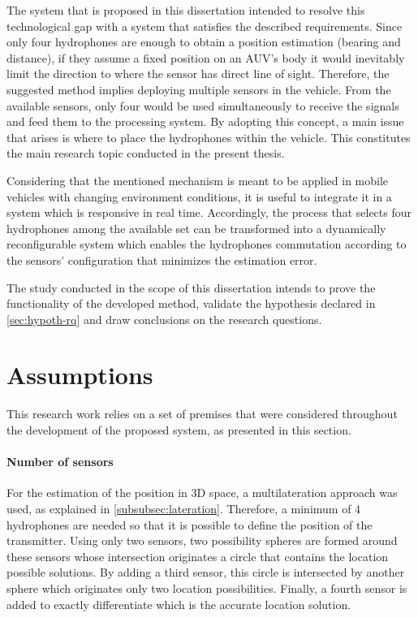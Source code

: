 The system that is proposed in this dissertation intended to resolve this technological gap with a system that satisfies the described requirements. Since only four hydrophones are enough to obtain a position estimation (bearing and distance), if they assume a fixed position on an AUV's body it would inevitably limit the direction to where the sensor has direct line of sight. Therefore, the suggested method implies deploying multiple sensors in the vehicle. From the available sensors, only four would be used simultaneously to receive the signals and feed them to the processing system. By adopting this concept, a main issue that arises is where to place the hydrophones within the vehicle. This constitutes the main research topic conducted in the present thesis.

Considering that the mentioned mechanism is meant to be applied in mobile vehicles with changing environment conditions, it is useful to integrate it in a system which is responsive in real time. Accordingly, the process that selects four hydrophones among the available set can be transformed into a dynamically reconfigurable system which enables the hydrophones commutation according to the sensors' configuration that minimizes the estimation error.

The study conducted in the scope of this dissertation intends to prove the functionality of the developed method, validate the hypothesis declared in \ref{sec:hypoth-rq} and draw conclusions on the research questions.

\section{Assumptions} \label{sec:premises}

This research work relies on a set of premises that were considered throughout the development of the proposed system, as presented in this section.

\paragraph{Number of sensors} For the estimation of the position in 3D space, a multilateration approach was used, as explained in \ref{subsubsec:lateration}. Therefore, a minimum of 4 hydrophones are needed so that it is possible to define the position of the transmitter. Using only two sensors, two possibility spheres are formed around these sensors whose intersection originates a circle that contains the location possible solutions. By adding a third sensor, this circle is intersected by another sphere which originates only two location possibilities. Finally, a fourth sensor is added to exactly differentiate which is the accurate location solution.

